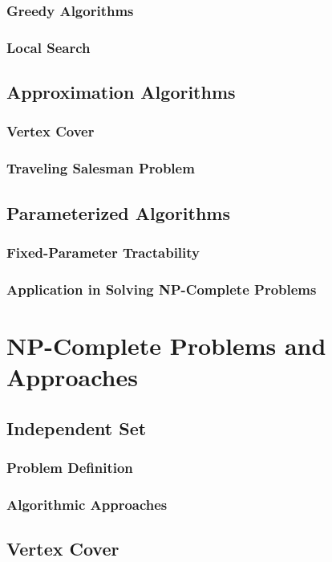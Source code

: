 \documentclass[12pt]{book} %
\begin{document}
\subsubsection{Greedy Algorithms}
\subsubsection{Local Search}
\subsection{Approximation Algorithms}
\subsubsection{Vertex Cover}
\subsubsection{Traveling Salesman Problem}
\subsection{Parameterized Algorithms}
\subsubsection{Fixed-Parameter Tractability}
\subsubsection{Application in Solving NP-Complete Problems}

\section{NP-Complete Problems and Approaches}
\subsection{Independent Set}
\subsubsection{Problem Definition}
\subsubsection{Algorithmic Approaches}
\subsection{Vertex Cover}
\end{document}
